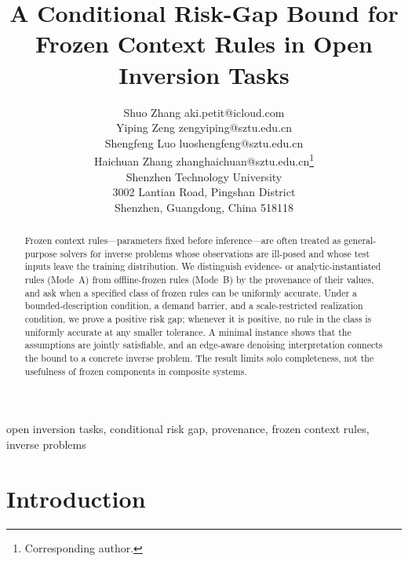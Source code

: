 \documentclass[twoside,11pt]{article}
\begin{document}
\title{A Conditional Risk-Gap Bound for Frozen Context Rules in Open Inversion Tasks}

\author{\name Shuo Zhang \email aki.petit@icloud.com \\ %
       \name Yiping Zeng \email zengyiping@sztu.edu.cn \\
       \name Shengfeng Luo \email luoshengfeng@sztu.edu.cn \\
       \name Haichuan Zhang \email zhanghaichuan@sztu.edu.cn\thanks{Corresponding author.} \\[2pt]
       \addr Shenzhen Technology University\\ %
       3002 Lantian Road, Pingshan District\\
       Shenzhen, Guangdong, China 518118}


\maketitle

\begin{abstract}%
Frozen context rules---parameters fixed before inference---are often treated as general-purpose solvers for inverse problems whose observations are ill-posed and whose test inputs leave the training distribution. We distinguish evidence- or analytic-instantiated rules (Mode~A) from offline-frozen rules (Mode~B) by the provenance of their values, and ask when a specified class of frozen rules can be uniformly accurate. Under a bounded-description condition, a demand barrier, and a scale-restricted realization condition, we prove a positive risk gap; whenever it is positive, no rule in the class is uniformly accurate at any smaller tolerance. A minimal instance shows that the assumptions are jointly satisfiable, and an edge-aware denoising interpretation connects the bound to a concrete inverse problem. The result limits solo completeness, not the usefulness of frozen components in composite systems.
\end{abstract}

\begin{keywords}
  open inversion tasks, conditional risk gap, provenance, frozen context rules, inverse problems
\end{keywords}

\section{Introduction}
\label{ch:intro}%
\end{document}
